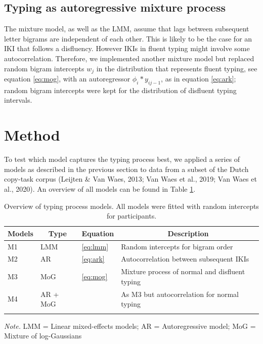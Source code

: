 \documentclass[
  english,
  man,mask,floatsintext]{apa7}
\begin{document}
\hypertarget{typing-as-autoregressive-mixture-process}{%
\subsection{Typing as autoregressive mixture process}\label{typing-as-autoregressive-mixture-process}}

The mixture model, as well as the LMM, assume that lags between subsequent letter bigrams are independent of each other. This is likely to be the case for an IKI that follows a disfluency. However IKIs in fluent typing might involve some autocorrelation. Therefore, we implemented another mixture model but replaced random bigram intercepts \(w_j\) in the distribution that represents fluent typing, see equation \ref{eq:mog}, with an autoregressor \(\phi_i*y_{ij-1}\), as in equation \ref{eq:ark}; random bigram intercepts were kept for the distribution of disfluent typing intervals.

\hypertarget{method}{%
\section{Method}\label{method}}

To test which model captures the typing process best, we applied a series of models as described in the previous section to data from a subset of the Dutch copy-task corpus (Leijten \& Van Waes, 2013; Van Waes et al., 2019; Van Waes et al., 2020). An overview of all models can be found in Table \ref{tab:models}.

\begin{table}[!ht]

\begin{center}
\begin{threeparttable}

\caption{\label{tab:models}Overview of typing process models. All models were fitted with random intercepts for participants.}

\begin{tabular}{llll}
\toprule
Models & \multicolumn{1}{c}{Type} & \multicolumn{1}{c}{Equation} & \multicolumn{1}{c}{Description}\\
\midrule
M1 & LMM & \ref{eq:lmm} & Random intercepts for bigram order\\
M2 & AR & \ref{eq:ark} & Autocorrelation between subsequent IKIs\\
M3 & MoG & \ref{eq:mog} & Mixture process of normal and disfluent typing\\
M4 & AR + MoG &  & As M3 but autocorrelation for normal typing\\
\bottomrule
\addlinespace
\end{tabular}

\begin{tablenotes}[para]
\normalsize{\textit{Note.} LMM = Linear mixed-effects models; AR = Autoregressive model; MoG = Mixture of log-Gaussians}
\end{tablenotes}

\end{threeparttable}
\end{center}

\end{table}
\end{document}
